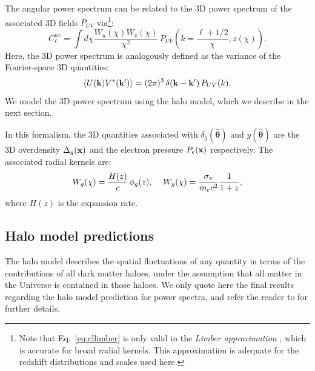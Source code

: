 \documentclass[useAMS,usenatbib]{mn2e}
\newcommand{\nv}{\hat{\boldsymbol{\theta}}}
\begin{document}
    The angular power spectrum can be related to the 3D power spectrum of the associated 3D fields $P_{UV}$ via\footnote{Note that Eq.\!~\ref{eq:cllimber} is only valid in the {\sl Limber approximation} \citep{1953ApJ...117..134L,1992ApJ...388..272K}, which is accurate for broad radial kernels. This approximation is adequate for the redshift distributions and scales used here.}:
    \begin{equation}\label{eq:cllimber}
      C_\ell^{uv} = \int d\chi \frac{W_u(\chi)W_v(\chi)}{\chi^2}\,P_{UV}\left(k=\frac{\ell+1/2}{\chi},z(\chi) \right).
    \end{equation}
    Here, the 3D power spectrum is analogously defined as the variance of the Fourier-space 3D quantities:
    \begin{equation}
      \left\langle U({\bf k})V^*({\bf k}')\right\rangle = (2\pi)^3\,\delta({\bf k}-{\bf k}')\,P_{UV}(k).
    \end{equation}
    We model the 3D power spectrum using the halo model, which we describe in the next section.

    In this formalism, the 3D quantities associated with $\delta_g(\nv)$ and $y(\nv)$ are the 3D overdensity $\Delta_g({\bf x})$ and the electron pressure $P_e({\bf x})$ respectively. The associated radial kernels are:
    \begin{equation}
      W_g(\chi)=\frac{H(z)}{c}\,\phi_g(z),\hspace{12pt}W_y(\chi)=\frac{\sigma_{\scriptscriptstyle\rm T}}{m_ec^2}\frac{1}{1+z},
    \end{equation}
    where $H(z)$ is the expansion rate.

  \subsection{Halo model predictions}\label{ssec:theory.hm}
    The halo model describes the spatial fluctuations of any quantity in terms of the contributions of all dark matter haloes, under the assumption that all matter in the Universe is contained in those haloes. We only quote here the final results regarding the halo model prediction for power spectra, and refer the reader to \cite{2000MNRAS.318..203S,2000MNRAS.318.1144P,2002PhR...372....1C} for further details.
    
\end{document}
